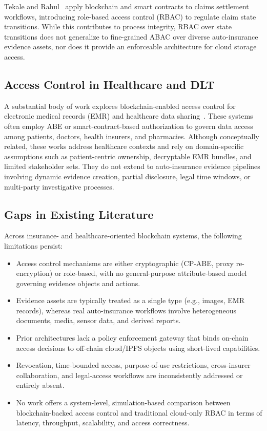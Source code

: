 \documentclass[final,5p,times,twocolumn]{elsarticle}
\begin{document}
Tekale and Rahul~\cite{tekale2023claims} apply blockchain and smart contracts to claims settlement workflows, introducing role-based access control (RBAC) to regulate claim state transitions. While this contributes to process integrity, RBAC over state transitions does not generalize to fine-grained ABAC over diverse auto-insurance evidence assets, nor does it provide an enforceable architecture for cloud storage access.

\subsection{Access Control in Healthcare and DLT}
A substantial body of work explores blockchain-enabled access control for electronic medical records (EMR) and healthcare data sharing~\cite{liang2017mhealth,theodouli2018healthcare,sun2020emr,rana2022healthcare}. These systems often employ ABE or smart-contract-based authorization to govern data access among patients, doctors, health insurers, and pharmacies. Although conceptually related, these works address healthcare contexts and rely on domain-specific assumptions such as patient-centric ownership, decryptable EMR bundles, and limited stakeholder sets. They do not extend to auto-insurance evidence pipelines involving dynamic evidence creation, partial disclosure, legal time windows, or multi-party investigative processes.

\subsection{Gaps in Existing Literature}
Across insurance- and healthcare-oriented blockchain systems, the following limitations persist:
\begin{itemize}
	\item Access control mechanisms are either cryptographic (CP-ABE, proxy re-encryption) or role-based, with no general-purpose attribute-based model governing evidence objects and actions.
	\item Evidence assets are typically treated as a single type (e.g., images, EMR records), whereas real auto-insurance workflows involve heterogeneous documents, media, sensor data, and derived reports.
	\item Prior architectures lack a policy enforcement gateway that binds on-chain access decisions to off-chain cloud/IPFS objects using short-lived capabilities.
	\item Revocation, time-bounded access, purpose-of-use restrictions, cross-insurer collaboration, and legal-access workflows are inconsistently addressed or entirely absent.
	\item No work offers a system-level, simulation-based comparison between blockchain-backed access control and traditional cloud-only RBAC in terms of latency, throughput, scalability, and access correctness.
\end{itemize}
\end{document}
